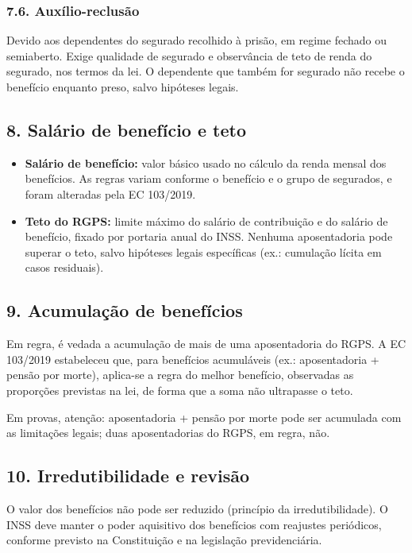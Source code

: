 \documentclass[11pt,a4paper]{article}
\begin{document}
\subsubsection*{7.6. Auxílio-reclusão}

Devido aos dependentes do segurado recolhido à prisão, em regime fechado ou semiaberto. Exige qualidade de segurado e observância de teto de renda do segurado, nos termos da lei. O dependente que também for segurado não recebe o benefício enquanto preso, salvo hipóteses legais.

\subsection*{8. Salário de benefício e teto}

\begin{itemize}
  \item \textbf{Salário de benefício:} valor básico usado no cálculo da renda mensal dos benefícios. As regras variam conforme o benefício e o grupo de segurados, e foram alteradas pela EC 103/2019.
  \item \textbf{Teto do RGPS:} limite máximo do salário de contribuição e do salário de benefício, fixado por portaria anual do INSS. Nenhuma aposentadoria pode superar o teto, salvo hipóteses legais específicas (ex.: cumulação lícita em casos residuais).
\end{itemize}

\subsection*{9. Acumulação de benefícios}

Em regra, é vedada a acumulação de mais de uma aposentadoria do RGPS. A EC 103/2019 estabeleceu que, para benefícios acumuláveis (ex.: aposentadoria + pensão por morte), aplica-se a regra do melhor benefício, observadas as proporções previstas na lei, de forma que a soma não ultrapasse o teto.

Em provas, atenção: aposentadoria + pensão por morte pode ser acumulada com as limitações legais; duas aposentadorias do RGPS, em regra, não.

\subsection*{10. Irredutibilidade e revisão}

O valor dos benefícios não pode ser reduzido (princípio da irredutibilidade). O INSS deve manter o poder aquisitivo dos benefícios com reajustes periódicos, conforme previsto na Constituição e na legislação previdenciária.
\end{document}
